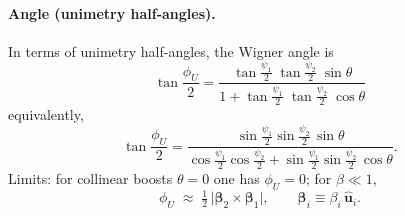 \documentclass[11pt]{article}
\numberwithin{equation}{section}
\begin{document}
\paragraph{Angle (unimetry half-angles).}
In terms of unimetry half-angles, the Wigner angle is
\begin{equation}
\boxed{\;
\tan\frac{\phi_U}{2}=
\frac{\tan\frac{\psi_1}{2}\;\tan\frac{\psi_2}{2}\;\sin\theta}
{1+\tan\frac{\psi_1}{2}\;\tan\frac{\psi_2}{2}\;\cos\theta}
\;}
\label{eq:wigner-angle-tan}
\end{equation}
equivalently,
\begin{equation}
\tan\frac{\phi_U}{2}=
\frac{\sin\frac{\psi_1}{2}\sin\frac{\psi_2}{2}\,\sin\theta}
{\cos\frac{\psi_1}{2}\cos\frac{\psi_2}{2}+\sin\frac{\psi_1}{2}\sin\frac{\psi_2}{2}\,\cos\theta}.
\label{eq:wigner-angle-sincos}
\end{equation}
Limits: for collinear boosts $\theta=0$ one has $\phi_U=0$; for $\beta\ll1$,
\begin{equation}
\phi_U \;\approx\; \tfrac{1}{2}\,\bigl\lvert \boldsymbol{\beta}_2\times \boldsymbol{\beta}_1 \bigr\rvert,
\qquad \boldsymbol{\beta}_i\equiv \beta_i\,\hat{\mathbf u}_i.
\label{eq:wigner-smallbeta}
\end{equation}
\end{document}
